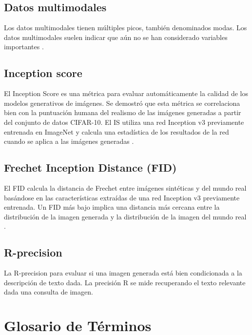 \section{Datos multimodales}
Los datos multimodales tienen múltiples picos, también denominados modas. Los datos multimodales suelen indicar que aún no se han considerado variables importantes \cite{unknown-author-2018}.

\section{Inception score}
El Inception Score es una métrica para evaluar automáticamente la calidad de los modelos generativos de imágenes. Se demostró que esta métrica se correlaciona bien con la puntuación humana del realismo de las imágenes generadas a partir del conjunto de datos CIFAR-10. El IS utiliza una red Inception v3 previamente entrenada en ImageNet y calcula una estadística de los resultados de la red cuando se aplica a las imágenes generadas \cite{barratt2018note}.

\section{Frechet Inception Distance (FID)}

El FID \cite{2020arXiv200914075M} calcula la distancia de Frechet entre imágenes sintéticas y del mundo real basándose en las características extraídas de una red Inception v3 previamente entrenada. Un FID más bajo implica una distancia más cercana entre la distribución de la imagen generada y la distribución de la imagen del mundo real \cite{soloveitchik2021conditional}.

 \section{R-precision}
 La R-precision  para evaluar si una imagen generada está bien condicionada a la descripción de texto dada. La precisión R se mide recuperando el texto relevante dada una consulta de imagen.
\chapter{Glosario de Términos}

